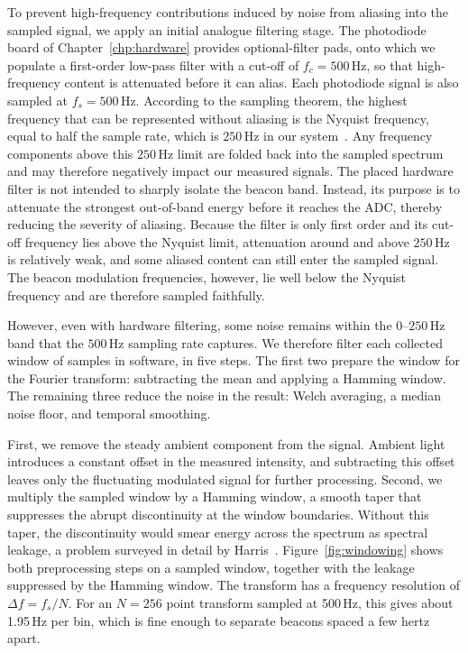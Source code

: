 To prevent high-frequency contributions induced by noise from aliasing into the sampled signal, we apply an initial analogue filtering stage. The photodiode board of Chapter~\ref{chp:hardware} provides optional-filter pads, onto which we populate a first-order low-pass filter with a cut-off of $f_c = 500$\,Hz,  so that high-frequency content is attenuated before it can alias. Each photodiode signal is also sampled at $f_s = 500$\,Hz. According to the sampling theorem, the highest frequency that can be represented without aliasing is the Nyquist frequency, equal to half the sample rate, which is $250$\,Hz in our system~\cite{oppenheim1999dsp}. Any frequency components above this $250$\,Hz limit are folded back into the sampled spectrum and may therefore negatively impact our measured signals. The placed hardware filter is not intended to sharply isolate the beacon band. Instead, its purpose is to attenuate the strongest out-of-band energy before it reaches the ADC, thereby reducing the severity of aliasing. Because the filter is only first order and its cut-off frequency lies above the Nyquist limit, attenuation around and above $250$\,Hz is relatively weak, and some aliased content can still enter the sampled signal. The beacon modulation frequencies, however, lie well below the Nyquist frequency and are therefore sampled faithfully.

However, even with hardware filtering, some noise remains within the $0$--$250$\,Hz band that the $500$\,Hz sampling rate captures. We therefore filter each collected window of samples in software, in five steps. The first two prepare the window for the Fourier transform: subtracting the mean and applying a Hamming window. The remaining three reduce the noise in the result: Welch averaging, a median noise floor, and temporal smoothing.

First, we remove the steady ambient component from the signal. Ambient light introduces a constant offset in the measured intensity, and subtracting this offset leaves only the fluctuating modulated signal for further processing. Second, we multiply the sampled window by a Hamming window, a smooth taper that suppresses the abrupt discontinuity at the window boundaries. Without this taper, the discontinuity would smear energy across the spectrum as spectral leakage, a problem surveyed in detail by Harris~\cite{harris1978windows}. Figure~\ref{fig:windowing} shows both preprocessing steps on a sampled window, together with the leakage suppressed by the Hamming window. The transform has a frequency resolution of $\Delta f = f_s / N$. For an $N=256$ point transform sampled at 500\,Hz, this gives about 1.95\,Hz per bin, which is fine enough to separate beacons spaced a few hertz apart.

